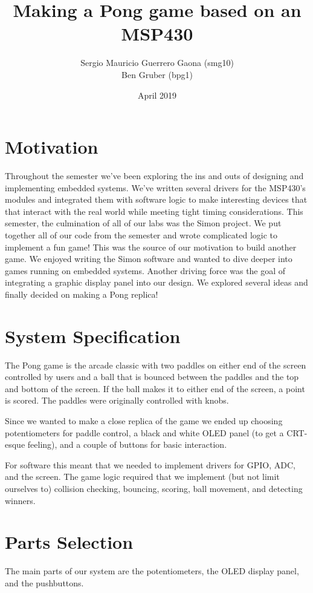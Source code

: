 \documentclass{article}
\title{Making a Pong game based on an MSP430}
\author{Sergio Mauricio Guerrero Gaona (smg10) \\ Ben Gruber (bpg1)}
\date{April 2019}
\begin{document}
\maketitle

\section{Motivation}
Throughout the semester we've been exploring the ins and outs of designing and implementing embedded systems. We've written
several drivers for the MSP430's modules and integrated them with software logic to make interesting devices that that interact with the real world while meeting tight timing considerations. This semester, the culmination of all of our labs was the
Simon project. We put together all of our code from the semester and wrote complicated logic to implement a fun game! This was
the source of our motivation to build another game. We enjoyed writing the Simon software and wanted to dive deeper into games
running on embedded systems. Another driving force was the goal of integrating a graphic display panel into our design. We
explored several ideas and finally decided on making a Pong replica!

\section{System Specification}
The Pong game is the arcade classic with two paddles on either end of the screen controlled by users and a ball that is bounced between the paddles and the top and bottom of the screen. If the ball makes it to either end of the screen, a point is scored. The paddles were originally controlled with knobs. 

Since we wanted to make a close replica of the game we ended up choosing potentiometers for paddle control, a black and white OLED panel (to get a CRT-esque feeling), and a couple of buttons for basic interaction.

For software this meant that we needed to implement drivers for GPIO, ADC, and the screen. The game logic required that we implement (but not limit ourselves to) collision checking, bouncing, scoring, ball movement, and detecting winners.
\pagebreak

\section{Parts Selection}
The main parts of our system are the potentiometers, the OLED display panel, and the pushbuttons.
\end{document}
